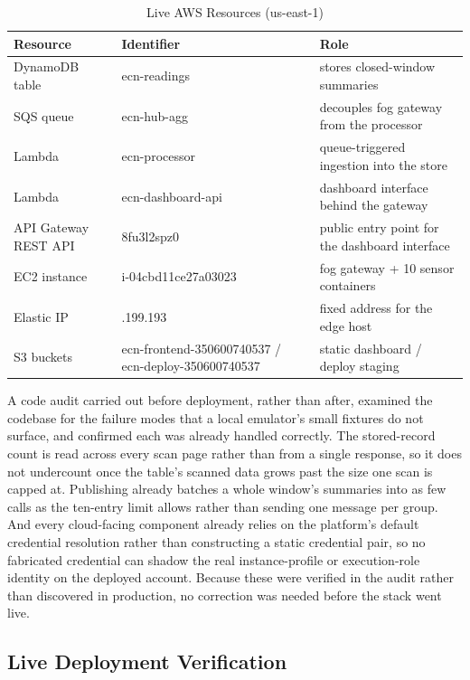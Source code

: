 \documentclass[conference]{IEEEtran}
\begin{document}
\begin{table}[!t]
\caption{Live AWS Resources (us-east-1)}
\label{tab:resources}
\centering
\footnotesize
\begin{tabular}{|>{\raggedright\arraybackslash}p{1.7cm}|>{\raggedright\arraybackslash}p{2.9cm}|>{\raggedright\arraybackslash}p{2.6cm}|}
\hline
\textbf{Resource} & \textbf{Identifier} & \textbf{Role} \\
\hline
DynamoDB table & ecn-readings & stores closed-window summaries \\
\hline
SQS queue & ecn-hub-agg & decouples fog gateway from the processor \\
\hline
Lambda & ecn-processor & queue-triggered ingestion into the store \\
\hline
Lambda & ecn-dashboard-api & dashboard interface behind the gateway \\
\hline
API Gateway REST API & 8fu3l2spz0 & public entry point for the dashboard interface \\
\hline
EC2 instance & i-04cbd11ce27a03023 & fog gateway + 10 sensor containers \\
\hline
Elastic IP & 52.202.199.193 & fixed address for the edge host \\
\hline
S3 buckets & ecn-frontend-350600740537 / ecn-deploy-350600740537 & static dashboard / deploy staging \\
\hline
\end{tabular}
\end{table}

A code audit carried out before deployment, rather than after, examined the codebase for the failure modes that a local emulator's small fixtures do not surface, and confirmed each was already handled correctly. The stored-record count is read across every scan page rather than from a single response, so it does not undercount once the table's scanned data grows past the size one scan is capped at. Publishing already batches a whole window's summaries into as few calls as the ten-entry limit allows rather than sending one message per group. And every cloud-facing component already relies on the platform's default credential resolution rather than constructing a static credential pair, so no fabricated credential can shadow the real instance-profile or execution-role identity on the deployed account. Because these were verified in the audit rather than discovered in production, no correction was needed before the stack went live.

\subsection{Live Deployment Verification}
\end{document}
